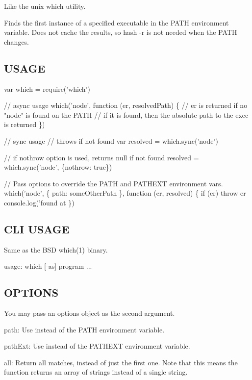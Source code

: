 Like the unix {\ttfamily which} utility.

Finds the first instance of a specified executable in the P\+A\+TH environment variable. Does not cache the results, so {\ttfamily hash -\/r} is not needed when the P\+A\+TH changes.

\subsection*{U\+S\+A\+GE}


\begin{DoxyCode}
var which = require('which')

// async usage
which('node', function (er, resolvedPath) \{
  // er is returned if no "node" is found on the PATH
  // if it is found, then the absolute path to the exec is returned
\})

// sync usage
// throws if not found
var resolved = which.sync('node')

// if nothrow option is used, returns null if not found
resolved = which.sync('node', \{nothrow: true\})

// Pass options to override the PATH and PATHEXT environment vars.
which('node', \{ path: someOtherPath \}, function (er, resolved) \{
  if (er)
    throw er
  console.log('found at %
\})
\end{DoxyCode}


\subsection*{C\+LI U\+S\+A\+GE}

Same as the B\+SD {\ttfamily which(1)} binary.


\begin{DoxyCode}
usage: which [-as] program ...
\end{DoxyCode}


\subsection*{O\+P\+T\+I\+O\+NS}

You may pass an options object as the second argument.


\begin{DoxyItemize}
\item {\ttfamily path}\+: Use instead of the {\ttfamily P\+A\+TH} environment variable.
\item {\ttfamily path\+Ext}\+: Use instead of the {\ttfamily P\+A\+T\+H\+E\+XT} environment variable.
\item {\ttfamily all}\+: Return all matches, instead of just the first one. Note that this means the function returns an array of strings instead of a single string. 
\end{DoxyItemize}